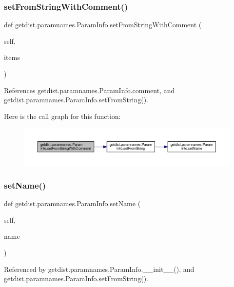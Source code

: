 \subsubsection{\texorpdfstring{set\+From\+String\+With\+Comment()}{setFromStringWithComment()}}
{\footnotesize\ttfamily def getdist.\+paramnames.\+Param\+Info.\+set\+From\+String\+With\+Comment (\begin{DoxyParamCaption}\item[{}]{self,  }\item[{}]{items }\end{DoxyParamCaption})}



References getdist.\+paramnames.\+Param\+Info.\+comment, and getdist.\+paramnames.\+Param\+Info.\+set\+From\+String().

Here is the call graph for this function\+:
\nopagebreak
\begin{figure}[H]
\begin{center}
\leavevmode
\includegraphics[width=350pt]{classgetdist_1_1paramnames_1_1ParamInfo_aa0a42d010bdc8b85811ebdcaf7f3a299_cgraph}
\end{center}
\end{figure}
\mbox{\label{classgetdist_1_1paramnames_1_1ParamInfo_aac1142515954029d6c6039eab3e42f46}} 
\subsubsection{\texorpdfstring{set\+Name()}{setName()}}
{\footnotesize\ttfamily def getdist.\+paramnames.\+Param\+Info.\+set\+Name (\begin{DoxyParamCaption}\item[{}]{self,  }\item[{}]{name }\end{DoxyParamCaption})}



Referenced by getdist.\+paramnames.\+Param\+Info.\+\_\+\+\_\+init\+\_\+\+\_\+(), and getdist.\+paramnames.\+Param\+Info.\+set\+From\+String().

